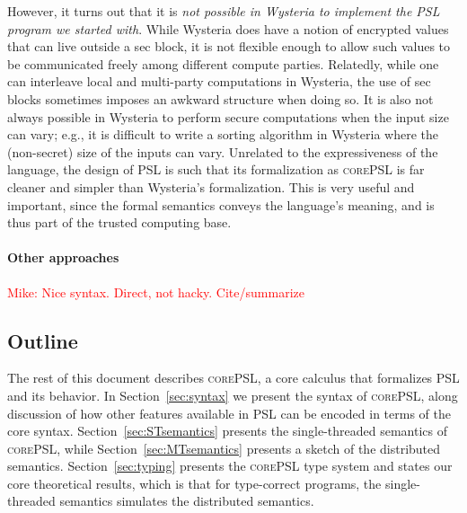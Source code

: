 \documentclass[10pt]{article}
\newcommand{\lang}{\textsc{corePSL}\xspace}
\newcommand{\mwh}[1]{\textcolor{red}{Mike: #1}}
\begin{document}
However, it turns out that it is \emph{not possible in Wysteria to implement the
PSL program we started with}. While Wysteria does have a notion of
encrypted values that can live outside a sec block, it is not flexible
enough to allow such values to be communicated freely among different
compute parties. Relatedly, while one can interleave local and
multi-party computations in Wysteria, the use of sec blocks sometimes
imposes an awkward structure when doing so. It is also not always
possible in Wysteria to perform secure computations when the input
size can vary; e.g., it is difficult to write a sorting algorithm in
Wysteria where the (non-secret) size of the inputs can vary. Unrelated
to the expressiveness of the language, the design of PSL is such that
its formalization as \lang is far cleaner and simpler than Wysteria's
formalization. This is very useful and important, since the
formal semantics conveys the language's meaning, and is thus part of
the trusted computing base.

\paragraph{Other approaches}

\mwh{Nice syntax. Direct, not hacky. Cite/summarize}

\subsection{Outline}

The rest of this document describes \lang, a core calculus that
formalizes PSL and its behavior. In Section~\ref{sec:syntax} we
present the syntax of \lang, along discussion of how other features
available in PSL can be encoded in terms of the core
syntax. Section~\ref{sec:STsemantics} presents the
single-threaded semantics of \lang, while
Section~\ref{sec:MTsemantics} presents a sketch of the distributed
semantics. Section~\ref{sec:typing} presents the \lang type system and
states our core theoretical results, which is that for type-correct
programs, the single-threaded semantics simulates the distributed
semantics.
\end{document}
